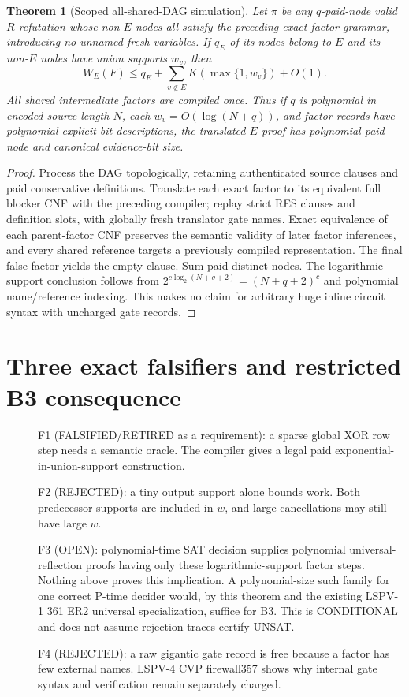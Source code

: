 \documentclass[11pt]{article}
\newtheorem{theorem}{Theorem}
\begin{document}
\begin{theorem}[Scoped all-shared-DAG simulation]
Let $\pi$ be any $q$-paid-node valid $R$ refutation whose non-$E$ nodes all satisfy the preceding exact factor grammar, introducing no unnamed fresh variables. If $q_E$ of its nodes belong to $E$ and its non-$E$ nodes have union supports $w_v$, then
\[
W_E(F)\le q_E+\sum_{v\notin E}K(\max\{1,w_v\})+O(1).
\]
All shared intermediate factors are compiled once. Thus if $q$ is polynomial in encoded source length $N$, each $w_v=O(\log(N+q))$, and factor records have polynomial explicit bit descriptions, the translated $E$ proof has polynomial paid-node and canonical evidence-bit size.
\end{theorem}
\begin{proof}
Process the DAG topologically, retaining authenticated source clauses and paid conservative definitions. Translate each exact factor to its equivalent full blocker CNF with the preceding compiler; replay strict RES clauses and definition slots, with globally fresh translator gate names. Exact equivalence of each parent-factor CNF preserves the semantic validity of later factor inferences, and every shared reference targets a previously compiled representation. The final false factor yields the empty clause. Sum paid distinct nodes. The logarithmic-support conclusion follows from $2^{c\log_2(N+q+2)}=(N+q+2)^c$ and polynomial name/reference indexing. This makes no claim for arbitrary huge inline circuit syntax with uncharged gate records.
\end{proof}

\section*{Three exact falsifiers and restricted B3 consequence}
\begin{description}
\item[] F1 (FALSIFIED/RETIRED as a requirement): a sparse global XOR row step needs a semantic oracle. The compiler gives a legal paid exponential-in-union-support construction.
\item[] F2 (REJECTED): a tiny output support alone bounds work. Both predecessor supports are included in $w$, and large cancellations may still have large $w$.
\item[] F3 (OPEN): polynomial-time SAT decision supplies polynomial universal-reflection proofs having only these logarithmic-support factor steps. Nothing above proves this implication. A polynomial-size such family for one correct P-time decider would, by this theorem and the existing LSPV-1 361 ER2 universal specialization, suffice for B3. This is CONDI\-TIONAL and does not assume rejection traces certify UNSAT.
\item[] F4 (REJECTED): a raw gigantic gate record is free because a factor has few external names. LSPV-4 CVP firewall357 shows why internal gate syntax and verification remain separately charged.
\end{description}
\end{document}
